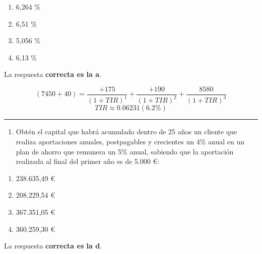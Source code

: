 \documentclass[
  letterpaper,
  DIV=11,
  numbers=noendperiod]{scrreprt}
\providecommand{\tightlist}{%
  \setlength{\itemsep}{0pt}\setlength{\parskip}{0pt}}\usepackage{longtable,booktabs,array}
\begin{document}
\begin{enumerate}
\def\labelenumi{\alph{enumi}.}
\item
  6,264 \%
\item
  6,51 \%
\item
  5,056 \%
\item
  6,13 \%
\end{enumerate}

\begin{tcolorbox}[enhanced jigsaw, left=2mm, opacityback=0, colback=white, breakable, arc=.35mm, bottomrule=.15mm, rightrule=.15mm, toprule=.15mm, leftrule=.75mm, colframe=quarto-callout-tip-color-frame]
\begin{minipage}[t]{5.5mm}
\textcolor{quarto-callout-tip-color}{\faLightbulb}
\end{minipage}%
\begin{minipage}[t]{\textwidth - 5.5mm}

La respuesta \textbf{correcta es la a}.

\[\left(7450+40\right)=\frac{+175}{\left(1+TIR\right)^1}+\frac{+190}{\left(1+TIR\right)^2}+\frac{8580}{\left(1+TIR\right)^3}\]
\[TIR\approx 0.06231(6.2\%)\]

\end{minipage}%
\end{tcolorbox}

\begin{center}\rule{0.5\linewidth}{0.5pt}\end{center}

\begin{enumerate}
\def\labelenumi{\arabic{enumi}.}
\setcounter{enumi}{104}
\tightlist
\item
  Obtén el capital que habrá acumulado dentro de 25 años un cliente que
  realiza aportaciones anuales, postpagables y crecientes un 4\% anual
  en un plan de ahorro que remunera un 5\% anual, sabiendo que la
  aportación realizada al final del primer año es de 5.000 €:
\end{enumerate}

\begin{enumerate}
\def\labelenumi{\alph{enumi}.}
\item
  238.635,49 €
\item
  208.229,54 €
\item
  367.351,05 €
\item
  360.259,30 €
\end{enumerate}

La respuesta \textbf{correcta es la d}.
\end{document}
